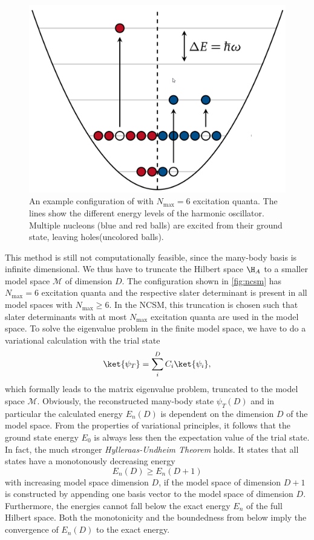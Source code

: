 \begin{figure}
  \includegraphics[width=.4\textwidth]{media/ncsm.png}
  \caption{An example configuration of  with $N_\mathrm{max} = 6$ excitation quanta. The lines show the different energy levels of the harmonic oscillator. Multiple nucleons (blue and red balls) are excited from their ground state, leaving holes(uncolored balls).}
  \label{fig:ncsm}
\end{figure}
This method is still not computationally feasible, since the many-body basis is infinite dimensional. We thus have to truncate the Hilbert space $\H_A$ to a smaller model space $\mathcal{M}$ of dimension $D$. The  configuration shown in \autoref{fig:ncsm} has $N_\mathrm{max} = 6$ excitation quanta and the respective slater determinant is present in all model spaces with $N_\mathrm{max} \geq 6$. In the NCSM, this truncation is chosen such that slater determinants with at most $N_\mathrm{max}$ excitation quanta are used in the model space.
To solve the eigenvalue problem in the finite model space, we have to do a variational calculation with the trial state
\begin{equation}
  \ket{\psi_T} = \sum_i^{D} C_i \ket{\psi_i},
\end{equation}
which formally leads to the matrix eigenvalue problem, truncated to the model space $\mathcal{M}$. Obviously, the reconstructed many-body state $\psi_T(D)$ and in particular the calculated energy $E_n(D)$ is dependent on the dimension $D$ of the model space. From the properties of variational principles, it follows that the ground state energy $E_0$ is always less then the expectation value of the trial state. In fact, the much stronger \textit{Hylleraas-Undheim Theorem} holds. It states that all states have a monotonously decreasing energy
\begin{equation}
  E_n(D) \geq E_n(D+1)
\end{equation}
with increasing model space dimension $D$, if the model space of dimension $D+1$ is constructed by appending one basis vector to the model space of dimension $D$. Furthermore, the energies cannot fall below the exact energy $E_n$ of the full Hilbert space. Both the monotonicity and the boundedness from below imply the convergence of $E_n(D)$ to the exact energy.

